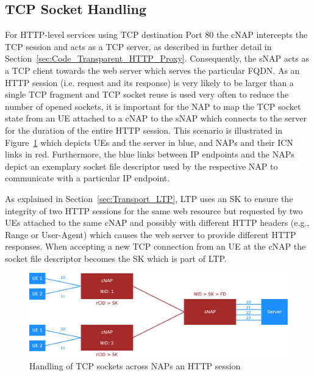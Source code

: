 \documentclass[a4paper,11pt,titlepage]{report}
\begin{document}
\subsection{TCP Socket Handling}
For \ac{HTTP}-level services using \ac{TCP} destination Port 80 the \ac{cNAP} intercepts the \ac{TCP} session and acts as a \ac{TCP} server, as described in further detail in Section~\ref{sec:Code_Transparent_HTTP_Proxy}. Consequently, the \ac{sNAP} acts as a \ac{TCP} client towards the web server which serves the particular \ac{FQDN}. As an \ac{HTTP} session (i.e. request and its response) is very likely to be larger than a single \ac{TCP} fragment and \ac{TCP} socket reuse is used very often to reduce the number of opened sockets, it is important for the \ac{NAP} to map the \ac{TCP} socket state from an \ac{UE} attached to a \ac{cNAP} to the \ac{sNAP} which connects to the server for the duration of the entire \acl{HTTP} session. This scenario is illustrated in Figure~\ref{fig:TCP_Socket_Mappings} which depicts \acp{UE} and the server in blue, and \acp{NAP} and their \ac{ICN} links in red. Furthermore, the blue links between IP endpoints and the \acp{NAP} depict an exemplary socket file descriptor used by the respective \ac{NAP} to communicate with a particular IP endpoint.

As explained in Section~\ref{sec:Transport_LTP}, \ac{LTP} uses an \ac{SK} to ensure the integrity of two \ac{HTTP} sessions for the same web resource but requested by two \acp{UE} attached to the same \ac{cNAP} and possibly with different \ac{HTTP} headers (e.g., Range or User-Agent) which causes the web server to provide different \ac{HTTP} responses. When accepting a new \ac{TCP} connection from an \ac{UE} at the \ac{cNAP} the socket file descriptor becomes the \ac{SK} which is part of \ac{LTP}.

\begin{figure}[htb]
\centering
\includegraphics[width=1\linewidth]{eps/tcpSocketMappings}
\caption{Handling of TCP sockets across \aclp{NAP} an HTTP session}
\label{fig:TCP_Socket_Mappings}
\end{figure}
\end{document}

